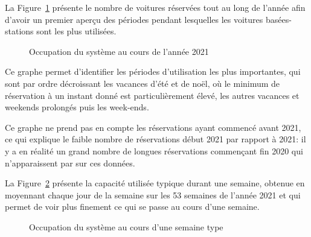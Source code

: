 \documentclass[12pt,a4paper]{article}
\newcommand{\1}[1]{\mathbbm{1}_{\{#1\}} }
\theoremstyle{definition}
\begin{document}
{La Figure~\ref{Année_sbcs} présente le nombre de voitures réservées tout au long de l'année afin d'avoir un premier aperçu des périodes pendant lesquelles les voitures basées-stations sont les plus utilisées. 

\begin{figure}[!h]
\centering
{}
\caption{Occupation du système au cours de l'année 2021}
\label{Année_sbcs}
\end{figure}

Ce graphe permet d'identifier les périodes d'utilisation les plus importantes, qui sont par ordre décroissant les vacances d'été et de noël, où le minimum de réservation à un instant donné est particulièrement élevé, les autres vacances et weekends prolongés puis les week-ends.

Ce graphe ne prend pas en compte les réservations ayant commencé avant 2021, ce qui explique le faible nombre de réservations début 2021 par rapport à 2021: il y a en réalité un grand nombre de longues réservations commençant fin 2020 qui n'apparaissent par sur ces données.


La Figure~\ref{semaine_type} présente la capacité utilisée typique durant une semaine, obtenue en moyennant chaque jour de la semaine sur les 53 semaines de l'année 2021 et qui permet de voir plus finement ce qui se passe au cours d'une semaine.


\begin{figure}[!h]
\centering
{}
\caption{Occupation du système au cours d'une semaine type}
\label{semaine_type}
\end{figure}

}
\end{document}
